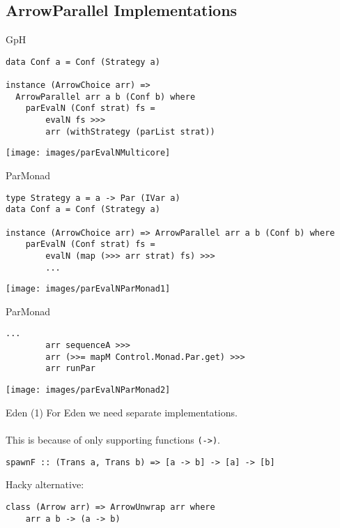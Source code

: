 \subsection{ArrowParallel Implementations}
\begin{frame}[fragile]{GpH}
\begin{lstlisting}[frame=htrbl]
data Conf a = Conf (Strategy a)

instance (ArrowChoice arr) =>
  ArrowParallel arr a b (Conf b) where
    parEvalN (Conf strat) fs =
        evalN fs >>>
        arr (withStrategy (parList strat))
\end{lstlisting}
\begin{center}
\texttt{[image: images/parEvalNMulticore]}
\end{center}
\end{frame}

\begin{frame}[fragile]{ParMonad}
\begin{lstlisting}[frame=htrbl]
type Strategy a = a -> Par (IVar a)
data Conf a = Conf (Strategy a)

instance (ArrowChoice arr) => ArrowParallel arr a b (Conf b) where
    parEvalN (Conf strat) fs =
        evalN (map (>>> arr strat) fs) >>>
        ...
\end{lstlisting}
\begin{center}
\texttt{[image: images/parEvalNParMonad1]}
\end{center}
\end{frame}

\begin{frame}[fragile]{ParMonad}
\begin{lstlisting}[frame=htrbl]
        ...
        arr sequenceA >>>
        arr (>>= mapM Control.Monad.Par.get) >>>
        arr runPar
\end{lstlisting}
\begin{center}
\texttt{[image: images/parEvalNParMonad2]}
\end{center}
\end{frame}


\begin{frame}[fragile]{Eden (1)}
For Eden we need separate implementations.\\~\\
This is because of  only supporting functions \lstinline{(->)}.
\begin{lstlisting}[frame=htrbl]
spawnF :: (Trans a, Trans b) => [a -> b] -> [a] -> [b]
\end{lstlisting}
\pause
Hacky alternative:
\begin{lstlisting}[frame=htrbl]
class (Arrow arr) => ArrowUnwrap arr where
    arr a b -> (a -> b)
\end{lstlisting}
\end{frame}


